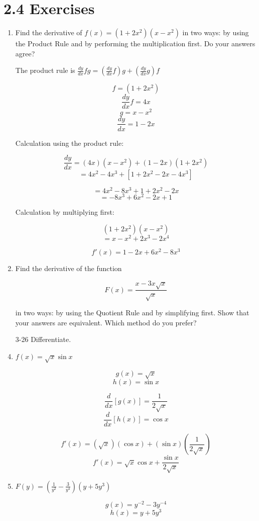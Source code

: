 \documentclass{article}
\begin{document}
	\section{2.4 Exercises}

	\begin{enumerate}

		\item Find the derivative of $f(x) = (1+2x^2)(x-x^2)$ in two
			ways: by using the Product Rule and by performing the
			multiplication first. Do your answers agree?

			The product rule is $\frac{dy}{dx} fg = (\frac{dy}{dx}f)g + (\frac{dy}{dx}g)f$

			$$f = (1 + 2x^2)$$
			$$\frac{dy}{dx}f = 4x$$
			$$g = x - x^2$$
			$$\frac{dy}{dx} = 1 - 2x$$

			Calculation using the product rule:

			$$\frac{dy}{dx} = (4x)(x-x^2) + (1-2x)(1+2x^2)$$
			$$ = 4x^2 - 4x^3 + [1 + 2x^2 - 2x - 4x^3]$$

			$$ = 4x^2 - 8x^3 + 1 + 2x^2 - 2x$$
			$$ = -8x^3 + 6x^2 - 2x + 1$$

			Calculation by multiplying first:

			$$(1+2x^2)(x-x^2)$$
			$$ = x - x^2 + 2x^3 - 2x^4$$

			$$ f'(x) = 1 - 2x + 6x^2 - 8x^3$$

		\item Find the derivative of the function

			$$ F(x) = \frac{x - 3x\sqrt{x}}{\sqrt{x}}$$

			in two ways: by using the Quotient Rule and by simplifying
			first. Show that your answers are equivalent. Which method
			do you prefer?


		\item[3-26] Differentiate.

		\item $f(x) = \sqrt{x} \sin x$

			$$g(x) = \sqrt{x}$$
			$$h(x) = \sin{x}$$

			$$\frac{d}{dx} [g(x)] = \frac{1}{2\sqrt{x}}$$
			$$\frac{d}{dx} [h(x)] = \cos x$$

			$$f'(x) = (\sqrt{x})(\cos x) + (\sin x)(\frac{1}{2\sqrt{x}})$$
			$$f'(x) = \sqrt{x} \cos x + \frac{\sin x}{2\sqrt{x}}$$

		\item $F(y) = ( \frac{1}{y^2} - \frac{3}{y^4} )(y + 5y^3)$

			$$g(x) = y^{-2} - 3y^{-4}$$
			$$h(x) = y + 5y^3$$


\end{enumerate}
\end{document}
